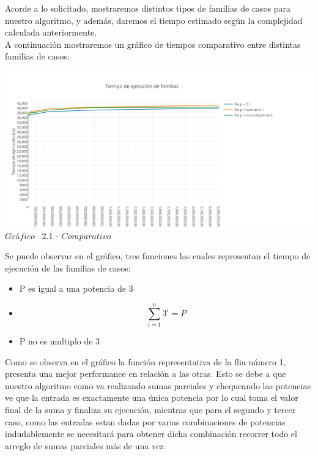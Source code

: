 \indent Acorde a lo solicitado, mostraremos distintos tipos de familias de casos para nuestro algoritmo, y adem\'as, daremos el tiempo estimado 
seg\'un la complejidad calculada anteriormente.\\

A continuaci\'on mostraremos un gr\'afico de tiempos comparativo entre distintas familias de casos:\\ 

\vspace*{0.3cm} \vspace*{0.3cm}
  \begin{center}
 \includegraphics[scale=0.65]{./EJ2/comparativo.png}
 {$Gr$\'a$fico$ \ 2.1 - $Comparativo$}
  \end{center}
  \vspace*{0.3cm}
  
Se puede observar en el gr\'afico, tres funciones las cuales representan el tiempo de ejecuci\'on de las familias de casos:\\
\begin{itemize}
\item P es igual a una potencia de 3
\item \[
\sum_{i=1}^{n}3^{i}=P 
\]
\item P no es multiplo de 3
\end{itemize}

Como se observa en el gr\'afico la funci\'on representativa de la flia n\'umero 1, presenta una mejor performance en relaci\'on a las otras. Esto se debe a que nuestro algoritmo como va realizando sumas parciales y chequeando las potencias ve que la entrada es exactamente una \'unica potencia por lo cual toma el valor final de la suma y finaliza su ejecuci\'on, mientras que para el segundo y tercer caso, como las entradas estan dadas por varias combinaciones de potencias indudablemente se necesitar\'a para obtener dicha combinaci\'on recorrer todo el arreglo de sumas parciales m\'as de una vez.

